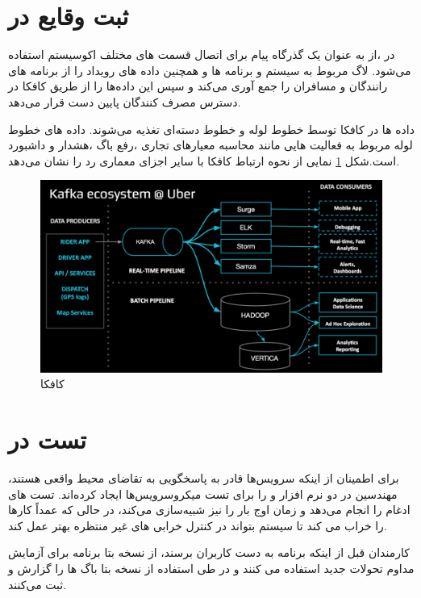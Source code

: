 \section{ثبت وقایع در }
در ،از \cite{kafka} به عنوان یک گذرگاه پیام برای اتصال قسمت های مختلف اکوسیستم استفاده می‌شود. لاگ مربوط به سیستم و برنامه ها و همچنین داده های رویداد را از برنامه های رانندگان و مسافران را جمع آوری می‌کند و سپس این داده‌‌ها را از طریق کافکا در دسترس مصرف کنندگان پایین دست قرار می‌دهد.

داده ها در کافکا توسط خطوط لوله  و خطوط دسته‌ای تغذیه می‌شوند. داده های خطوط لوله مربوط به فعالیت هایی مانند محاسبه معیارهای تجاری ،رفع باگ ،هشدار و داشبورد است.شکل \ref{fig:kafka} نمایی از نحوه ارتباط کافکا با سایر اجزای معماری رد  را نشان می‌دهد.\cite{kafka}

\begin{figure}[h]
\centering
\includegraphics[scale=0.3]{kafka.png}
\caption{کافکا}
\label{fig:kafka}
\end{figure}


\section{تست در }
برای اطمینان از اینکه سرویس‌ها قادر به پاسخگویی به تقاضای محیط واقعی هستند، مهندسین در   دو نرم افزار  و  را برای تست میکروسرویس‌‌ها ایجاد کرده‌اند. تست های ادغام را انجام می‌دهد و زمان اوج بار را نیز شبیه‌سازی می‌کند، در حالی که  عمداً کارها را خراب می کند تا سیستم بتواند در کنترل خرابی های غیر منتظره بهتر عمل کند.

کارمندان  قبل از اینکه برنامه به دست کاربران برسند، از نسخه بتا برنامه برای آزمایش مداوم تحولات جدید استفاده می کنند و در طی استفاده از نسخه بتا باگ ها را گزارش و ثبت می‌کنند.\cite{techstack}


